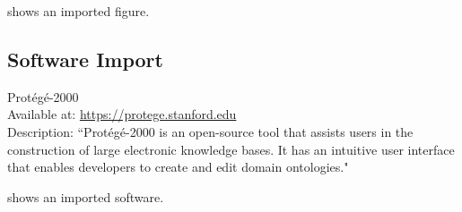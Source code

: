  shows an imported figure.

\subsection{Software Import}


\begin{software}
Prot{\'{e}}g{\'{e}}-2000~\cite{DBLP:conf/amia/NoyCFKTVM03}\\
Available at: \url{https://protege.stanford.edu}\\
Description: ``Prot\'{e}g\'{e}-2000 is an open-source tool that assists users in the construction of large electronic knowledge bases. It has an intuitive user interface that enables developers to create and edit domain ontologies."~\cite{DBLP:conf/amia/NoyCFKTVM03}
\label{software:protege}
\end{software}

 shows an imported software.


